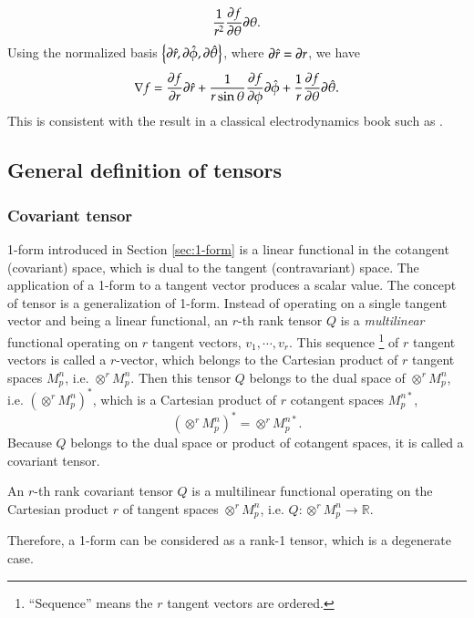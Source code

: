 \documentclass[11pt, a4paper]{book}
\begin{document}
\begin{Example}
\begin{equation}
    \frac{1}{r^2} \frac{\partial f}{\partial \theta} \boldsymbol{\partial}\theta.
  \end{equation}
  Using the normalized basis
  $\left\{ \boldsymbol{\partial}\hat{r}, \boldsymbol{\partial}\hat{\phi}, \boldsymbol{\partial}\hat{\theta}
  \right\}$, where $\boldsymbol{\partial}\hat{r} = \boldsymbol{\partial}r$, we have
  \begin{equation}
    \nabla f = \frac{\partial f}{\partial r}\boldsymbol{\partial}\hat{r} + \frac{1}{r\sin\theta} \frac{\partial f}{\partial \phi} \boldsymbol{\partial}\hat{\phi} +
    \frac{1}{r} \frac{\partial f}{\partial \theta} \boldsymbol{\partial}\hat{\theta}.
  \end{equation}
  This is consistent with the result in a classical electrodynamics book such as
  \citep{GriffithsIntroduction1999}.
\end{Example}

\subsection{General definition of tensors}

\subsubsection{Covariant tensor}
\label{sec:covariant-tensor}

1-form introduced in Section \ref{sec:1-form} is a linear functional in the cotangent
(covariant) space, which is dual to the tangent (contravariant) space. The application of
a 1-form to a tangent vector produces a scalar value. The concept of tensor is a
generalization of 1-form. Instead of operating on a single tangent vector and being a
linear functional, an $r$-th rank tensor $Q$ is a \emph{multilinear} functional operating
on $r$ tangent vectors, $v_1, \cdots, v_r$. This sequence \footnote{``Sequence'' means the
  $r$ tangent vectors are ordered.} of $r$ tangent vectors is called a $r$-vector, which
belongs to the Cartesian product of $r$ tangent spaces $M_p^n$, i.e. $\otimes^r M_p^n$.
Then this tensor $Q$ belongs to the dual space of $\otimes^r M_p^n$, i.e.
$\left( \otimes^r M_p^n \right)^*$, which is a Cartesian product of $r$ cotangent spaces
$M_p^{n*}$,
\begin{equation}
  \left( \otimes^r M_p^n \right)^* = \otimes^r M_p^{n*}.
\end{equation}
Because $Q$ belongs to the dual space or product of cotangent spaces, it is called a
covariant tensor.

\begin{Definition}
  An $r$-th rank covariant tensor $Q$ is a multilinear functional operating on the
  Cartesian product $r$ of tangent spaces $\otimes^r M_p^n$, i.e.
  $Q: \otimes^r M_p^n \rightarrow \mathbb{R}$.
\end{Definition}
Therefore, a 1-form can be considered as a rank-1 tensor, which is a degenerate case.
\end{document}
